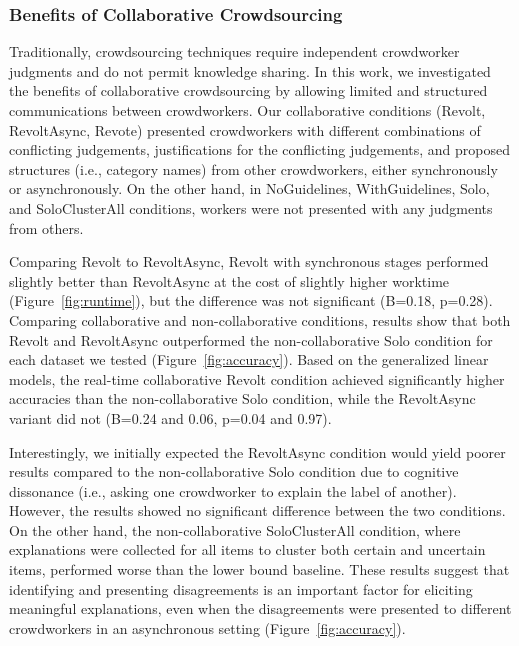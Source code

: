 \subsubsection{Benefits of Collaborative Crowdsourcing}

Traditionally, crowdsourcing techniques require independent crowdworker judgments and do not permit knowledge sharing. 
In this work, we investigated the benefits of collaborative crowdsourcing by allowing limited and structured communications between crowdworkers. Our collaborative conditions (Revolt, RevoltAsync, Revote) presented crowdworkers with different combinations of conflicting judgements, justifications for the conflicting judgements, and proposed structures (i.e., category names) from other crowdworkers, either synchronously or asynchronously. On the other hand, in NoGuidelines, WithGuidelines, Solo, and SoloClusterAll conditions, workers were not presented with any judgments from others.

Comparing Revolt to RevoltAsync, Revolt with synchronous stages performed slightly better than RevoltAsync at the cost of slightly higher worktime (Figure~\ref{fig:runtime}), but the difference was not significant (B=0.18, p=0.28). Comparing collaborative and non-collaborative conditions, results show that both Revolt and RevoltAsync outperformed the non-collaborative Solo condition for each  dataset we tested (Figure~\ref{fig:accuracy}). Based on the generalized linear models, the real-time collaborative Revolt condition achieved significantly higher accuracies than the  
non-collaborative Solo condition, while the RevoltAsync variant did not (B=0.24 and 0.06, p=0.04 and 0.97). 

Interestingly, we initially expected the RevoltAsync condition would yield poorer results compared to the non-collaborative Solo condition due to cognitive dissonance (i.e., asking one crowdworker to explain the label of another). However, the results showed no significant difference between the two conditions. On the other hand, the non-collaborative SoloClusterAll condition, where explanations were collected for all items to cluster both certain and uncertain items, performed worse than the lower bound baseline. These results suggest that identifying and presenting disagreements is an important factor for eliciting meaningful explanations, even when the disagreements were presented to different crowdworkers in an asynchronous setting (Figure~\ref{fig:accuracy}). 

